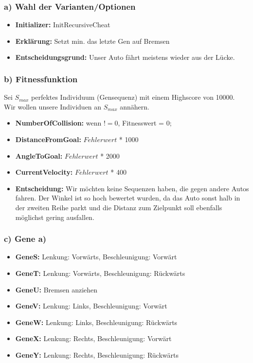 \documentclass{beamer}
\begin{document}
\begin{frame}
  \frametitle{\textbf{a)} Wahl der Varianten/Optionen}
  \begin{itemize}
    \item \textbf{Initializer:} InitRecursiveCheat 
    \item \textbf{Erklärung:} Setzt min. das letzte Gen auf Bremsen
    \item \textbf{Entscheidungsgrund:} Unser Auto fährt meistens wieder aus der Lücke.
   
   
  \end{itemize}
\end{frame}

\begin{frame}
  \frametitle{\textbf{b)} Fitnessfunktion}

  Sei $S_{max}$ perfektes Individuum (Gensequenz) mit einem Highscore von 10000. \\

  Wir wollen unsere Individuen an $S_{max}$ annähern.
 \begin{itemize}
    \item \textbf{NumberOfCollision:} wenn $ != 0 $, Fitnesswert = 0;
    \item \textbf{DistanceFromGoal:} $Fehlerwert$ * 1000
    \item \textbf{AngleToGoal:} $Fehlerwert$ * 2000
    \item \textbf{CurrentVelocity:} $Fehlerwert$ * 400
    \item \textbf{Entscheidung:} Wir möchten keine Sequenzen haben, die gegen andere Autos fahren. Der Winkel ist so hoch bewertet wurden, da das Auto sonst halb in der zweiten Reihe parkt und die Distanz zum Zielpunkt soll ebenfalls möglichst gering ausfallen.
   
   
  \end{itemize}
\end{frame}
\begin{frame}
  \frametitle{\textbf{c)} Gene a)}
  \begin{itemize}
    \item \textbf{GeneS:} Lenkung: Vorwärts, Beschleunigung: Vorwärt
    \item \textbf{GeneT:} Lenkung: Vorwärts, Beschleunigung: Rückwärts
    \item \textbf{GeneU:} Bremsen anziehen
    \item \textbf{GeneV:} Lenkung: Links, Beschleunigung: Vorwärt
    \item \textbf{GeneW:} Lenkung: Links, Beschleunigung: Rückwärts
    \item \textbf{GeneX:} Lenkung: Rechts, Beschleunigung: Vorwärt
    \item \textbf{GeneY:} Lenkung: Rechts, Beschleunigung: Rückwärts
  
  \end{itemize}
\end{frame}
\end{document}
